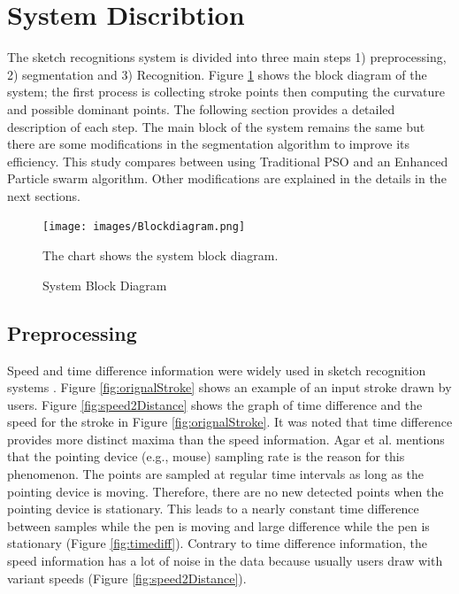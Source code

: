 \documentclass[preprint,1p,times,review]{elsarticle}
\begin{document}
\section{System Discribtion  }\label{Sysdisc}
 The sketch recognitions system is divided into three main steps 1) preprocessing, 2) segmentation and 3) Recognition. Figure \ref{fig:flowChart} shows the block diagram of the system; the first process is collecting stroke points then computing the curvature and possible dominant points.  The following section provides a detailed description of each step. The main block of the system remains the same but there are some modifications in the segmentation algorithm to improve its efficiency. This study compares between using Traditional PSO and an Enhanced Particle swarm algorithm. Other modifications are explained in the details in the next sections.


 \begin{figure}
	\centering
		\texttt{[image: images/Blockdiagram.png]}
	\caption{System Block Diagram} The chart shows the system block diagram.
	\label{fig:flowChart}
\end{figure}


\subsection{Preprocessing}
\label{Prepross}
  Speed and time difference information were widely used in sketch recognition systems \cite{earlyprocess}. Figure \ref{fig:orignalStroke} shows an example of an input stroke drawn by users.  Figure \ref{fig:speed2Distance} shows the graph of time difference and the speed for the stroke in Figure \ref{fig:orignalStroke}. It was noted that time difference provides more distinct maxima than the speed information. Agar et al. \cite{polygonfeedback31} mentions that the pointing device (e.g., mouse) sampling rate is the reason for this phenomenon. The points are sampled at regular time intervals as long as the pointing device is moving. Therefore, there are no new detected points when the pointing device is stationary. This leads to a nearly constant time difference between samples while the pen is moving and large difference while the pen is stationary (Figure \ref{fig:timediff}). Contrary to time difference information, the speed information has a lot of noise in the data because usually  users draw with variant speeds (Figure \ref{fig:speed2Distance}).  %
\end{document}
